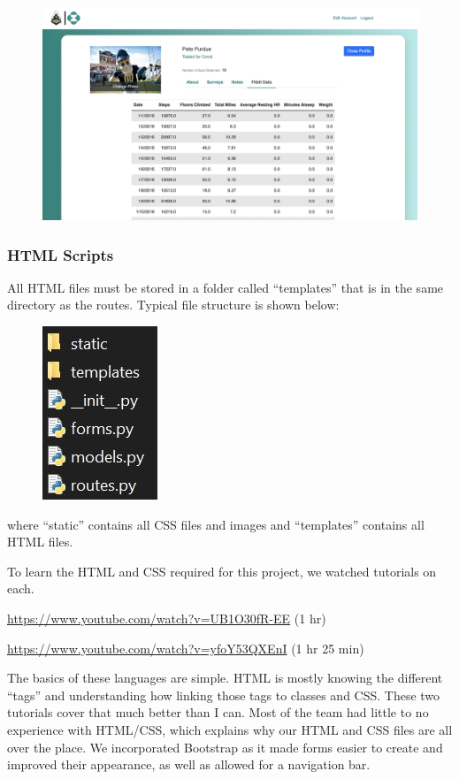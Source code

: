 \documentclass[]{book}
\begin{document}
\begin{figure}
\centering
\includegraphics{images/Fitbit_page.png}
\caption{}
\end{figure}

\subsubsection{HTML Scripts}\label{html-scripts}

All HTML files must be stored in a folder called ``templates'' that is
in the same directory as the routes. Typical file structure is shown
below:

\begin{figure}
\centering
\includegraphics{images/file_structure.jpg}
\caption{}
\end{figure}

where ``static'' contains all CSS files and images and ``templates''
contains all HTML files.

To learn the HTML and CSS required for this project, we watched
tutorials on each.

\url{https://www.youtube.com/watch?v=UB1O30fR-EE} (1 hr)

\url{https://www.youtube.com/watch?v=yfoY53QXEnI} (1 hr 25 min)

The basics of these languages are simple. HTML is mostly knowing the
different ``tags'' and understanding how linking those tags to classes
and CSS. These two tutorials cover that much better than I can. Most of
the team had little to no experience with HTML/CSS, which explains why
our HTML and CSS files are all over the place. We incorporated Bootstrap
as it made forms easier to create and improved their appearance, as well
as allowed for a navigation bar.
\end{document}
